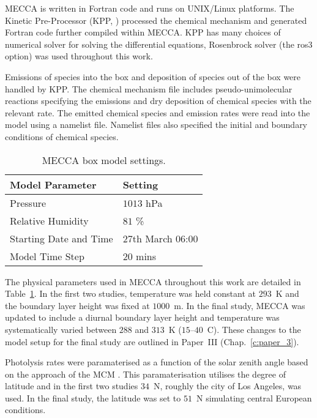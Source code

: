 MECCA is written in Fortran code and runs on UNIX/Linux platforms.
The Kinetic Pre-Processor (KPP, \citet{Damian:2002}) processed the chemical mechanism and generated Fortran code further compiled within MECCA.
KPP has many choices of numerical solver for solving the differential equations, Rosenbrock solver (the ros3 option) was used throughout this work.

Emissions of species into the box and deposition of species out of the box were handled by KPP.
The chemical mechanism file includes pseudo-unimolecular reactions specifying the emissions and dry deposition of chemical species with the relevant rate.
The emitted chemical species and emission rates were read into the model using a namelist file.  
Namelist files also specified the initial and boundary conditions of chemical species.

\begin{table}[t]%
    \begin{center}%
        \caption{MECCA box model settings.}%
        \begin{tabular}{ll}%
            \hline \hline
            \textbf{Model Parameter} & \textbf{Setting} \\
            \hline \hline
            Pressure & $1013$ hPa \\
            Relative Humidity & $81$ \% \\
            Starting Date and Time & 27th March 06:00 \\
            Model Time Step & $20$ mins \\
            \hline \hline
        \end{tabular}%
        \label{t:model_setup}%
    \end{center}%
\end{table}%
The physical parameters used in MECCA throughout this work are detailed in Table~\ref{t:model_setup}.
In the first two studies, temperature was held constant at $293$~K and the boundary layer height was fixed at $1000$~m.
In the final study, MECCA was updated to include a diurnal boundary layer height and temperature was systematically varied between $288$ and $313$~K ($15$--$40$~\degree C).
These changes to the model setup for the final study are outlined in Paper~III (Chap.~\ref{c:paper_3}).

Photolysis rates were paramaterised as a function of the solar zenith angle based on the approach of the MCM \citep{Jenkin:1997}.
This paramaterisation utilises the degree of latitude and in the first two studies $34$~\degree N, roughly the city of Los Angeles, was used.
In the final study, the latitude was set to $51$~\degree N simulating central European conditions.

